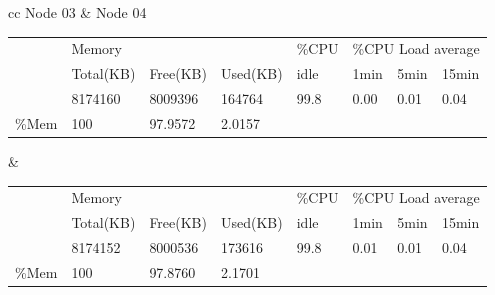 \documentclass[12pt,a4paper]{report}
\begin{document}
\begin{table}[h!]
\hspace*{-0.9in}
\begin{tabular}{ cc }   %
Node 03 &  Node 04 \\  
\begin{adjustbox}{max width=0.6\textwidth}
\begin{tabular}{l|l|l|l|llll}
\cline{2-8}
\multirow{3}{*}{}           & \multicolumn{3}{l|}{Memory}     & \multicolumn{1}{l|}{\%CPU} & \multicolumn{3}{l|}{\%CPU Load average}                                            \\ \cline{2-8} 
                            & Total(KB) & Free(KB) & Used(KB) & \multicolumn{1}{l|}{idle}  & \multicolumn{1}{l|}{1min} & \multicolumn{1}{l|}{5min} & \multicolumn{1}{l|}{15min} \\ \cline{2-8} 
                            & 8174160   & 8009396  & 164764   & \multicolumn{1}{l|}{99.8}  & \multicolumn{1}{l|}{0.00} & \multicolumn{1}{l|}{0.01} & \multicolumn{1}{l|}{0.04}  \\ \hline
\multicolumn{1}{|l|}{\%Mem} & 100       & 97.9572  & 2.0157   &                            &                           &                           &                            \\ \cline{1-4}
\end{tabular}
\end{adjustbox} &  %
\begin{adjustbox}{max width=0.6\textwidth}
\begin{tabular}{l|l|l|l|llll}
\cline{2-8}
\multirow{3}{*}{}           & \multicolumn{3}{l|}{Memory}     & \multicolumn{1}{l|}{\%CPU} & \multicolumn{3}{l|}{\%CPU Load average}                                            \\ \cline{2-8} 
                            & Total(KB) & Free(KB) & Used(KB) & \multicolumn{1}{l|}{idle}  & \multicolumn{1}{l|}{1min} & \multicolumn{1}{l|}{5min} & \multicolumn{1}{l|}{15min} \\ \cline{2-8} 
                            & 8174152   & 8000536  & 173616   & \multicolumn{1}{l|}{99.8}  & \multicolumn{1}{l|}{0.01} & \multicolumn{1}{l|}{0.01} & \multicolumn{1}{l|}{0.04}  \\ \hline
\multicolumn{1}{|l|}{\%Mem} & 100       & 97.8760  & 2.1701   &                            &                           &                           &                            \\ \cline{1-4}
\end{tabular}
\end{adjustbox}\\
\end{tabular}
\end{table}
\end{document}
